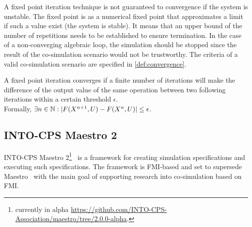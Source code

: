

A fixed point iteration technique is not guaranteed to convergence if the system is unstable. The fixed point is as a numerical fixed point that approximates a limit if such a value exist (the system is stable). It means that an upper bound of the number of repetitions needs to be established to ensure termination. In the case of a non-converging algebraic loop, the simulation should be stopped since the result of the co-simulation scenario would not be trustworthy. The criteria of a valid co-simulation scenario are specified in \cref{def:convergence}.

\begin{definition}\label{def:convergence}
A fixed point iteration converges if a finite number of iterations will make the difference of the output value of the same operation between two following iterations within a certain threshold $\epsilon$.\\
Formally, 
$\exists n \in \mathbb{N}: |F(X^{n+1}, U) - F(X^{n}, U)| \leq \epsilon$.
\end{definition}

\subsection{INTO-CPS Maestro 2}
INTO-CPS Maestro 2\footnote{currently in alpha \url{https://github.com/INTO-CPS-Association/maestro/tree/2.0.0-alpha}.}~\cite{Thule2020a} is a framework for creating simulation specifications and executing such specifications. The framework is FMI-based and set to supersede Maestro~\cite{Maestro} with the main goal of supporting research into co-simulation based on FMI. 

